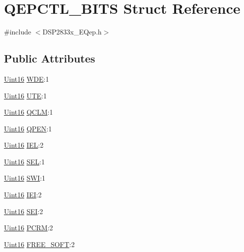 \hypertarget{struct_q_e_p_c_t_l___b_i_t_s}{}\section{Q\+E\+P\+C\+T\+L\+\_\+\+B\+I\+T\+S Struct Reference}
\label{struct_q_e_p_c_t_l___b_i_t_s}


{\ttfamily \#include $<$D\+S\+P2833x\+\_\+\+E\+Qep.\+h$>$}

\subsection*{Public Attributes}
\begin{DoxyCompactItemize}
\item 
\hyperlink{_d_s_p2833x___device_8h_a59a9f6be4562c327cbfb4f7e8e18f08b}{Uint16} \hyperlink{struct_q_e_p_c_t_l___b_i_t_s_a847775b55c5d81d05dcd1de1bca52c09}{W\+D\+E}\+:1
\item 
\hyperlink{_d_s_p2833x___device_8h_a59a9f6be4562c327cbfb4f7e8e18f08b}{Uint16} \hyperlink{struct_q_e_p_c_t_l___b_i_t_s_a69a58c7012dfb810361ecadfc215b2b4}{U\+T\+E}\+:1
\item 
\hyperlink{_d_s_p2833x___device_8h_a59a9f6be4562c327cbfb4f7e8e18f08b}{Uint16} \hyperlink{struct_q_e_p_c_t_l___b_i_t_s_ab04419f91d4bdd4700eeb25e8556de5f}{Q\+C\+L\+M}\+:1
\item 
\hyperlink{_d_s_p2833x___device_8h_a59a9f6be4562c327cbfb4f7e8e18f08b}{Uint16} \hyperlink{struct_q_e_p_c_t_l___b_i_t_s_abe9207cf42c4d938d95e8ef0c7782912}{Q\+P\+E\+N}\+:1
\item 
\hyperlink{_d_s_p2833x___device_8h_a59a9f6be4562c327cbfb4f7e8e18f08b}{Uint16} \hyperlink{struct_q_e_p_c_t_l___b_i_t_s_af3d87a40bd36a26cbd03f6d3de7d3cf0}{I\+E\+L}\+:2
\item 
\hyperlink{_d_s_p2833x___device_8h_a59a9f6be4562c327cbfb4f7e8e18f08b}{Uint16} \hyperlink{struct_q_e_p_c_t_l___b_i_t_s_af0f956fc7a575257376b287ffc181e79}{S\+E\+L}\+:1
\item 
\hyperlink{_d_s_p2833x___device_8h_a59a9f6be4562c327cbfb4f7e8e18f08b}{Uint16} \hyperlink{struct_q_e_p_c_t_l___b_i_t_s_ad7499cc1231003b100155a83bfc4c920}{S\+W\+I}\+:1
\item 
\hyperlink{_d_s_p2833x___device_8h_a59a9f6be4562c327cbfb4f7e8e18f08b}{Uint16} \hyperlink{struct_q_e_p_c_t_l___b_i_t_s_a554f1ae1b6ef404c583d3cddc4e59fbe}{I\+E\+I}\+:2
\item 
\hyperlink{_d_s_p2833x___device_8h_a59a9f6be4562c327cbfb4f7e8e18f08b}{Uint16} \hyperlink{struct_q_e_p_c_t_l___b_i_t_s_a3fa1eb9ddf089005185f581df74eca50}{S\+E\+I}\+:2
\item 
\hyperlink{_d_s_p2833x___device_8h_a59a9f6be4562c327cbfb4f7e8e18f08b}{Uint16} \hyperlink{struct_q_e_p_c_t_l___b_i_t_s_a309cfb6c8b45e751cb49cc6d3391ee71}{P\+C\+R\+M}\+:2
\item 
\hyperlink{_d_s_p2833x___device_8h_a59a9f6be4562c327cbfb4f7e8e18f08b}{Uint16} \hyperlink{struct_q_e_p_c_t_l___b_i_t_s_a592101ad3689f169a2fd3023d20e0f96}{F\+R\+E\+E\+\_\+\+S\+O\+F\+T}\+:2
\end{DoxyCompactItemize}


